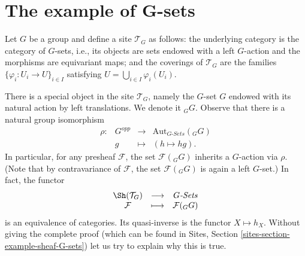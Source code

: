 \section{The example of G-sets}
\label{section-G-sets}

\noindent
Let $G$ be a group and define a site $\mathcal{T}_G$ as follows: the underlying
category is the category of $G$-sets, i.e., its objects are sets endowed
with a left $G$-action and the morphisms are equivariant maps; and the
coverings of $\mathcal{T}_G$ are the families
$\{\varphi_i : U_i \to U\}_{i\in I}$ satisfying
$U = \bigcup_{i\in I} \varphi_i(U_i)$.

\medskip\noindent
There is a special object in the site $\mathcal{T}_G$, namely the $G$-set $G$
endowed with its natural action by left translations. We denote it ${}_G G$.
Observe that there is a natural group isomorphism
$$
\begin{matrix}
\rho : & G^{opp} & \longrightarrow & \text{Aut}_{G\textit{-Sets}}({}_G G) \\
& g & \longmapsto & (h \mapsto hg).
\end{matrix}
$$
In particular, for any presheaf $\mathcal{F}$, the set $\mathcal{F}({}_G G)$
inherits a $G$-action via $\rho$. (Note that by contravariance of
$\mathcal{F}$, the set $\mathcal{F}({}_G G)$ is again a left $G$-set.) In fact,
the functor
$$
\begin{matrix}
\Sh(\mathcal{T}_G) & \longrightarrow & G\textit{-Sets} \\
\mathcal{F} & \longmapsto & \mathcal{F}({}_G G)
\end{matrix}
$$
is an equivalence of categories. Its quasi-inverse is the functor $X \mapsto
h_X$. Without giving the complete proof (which can be found in
Sites, Section \ref{sites-section-example-sheaf-G-sets})
let us try to explain why this is true.
